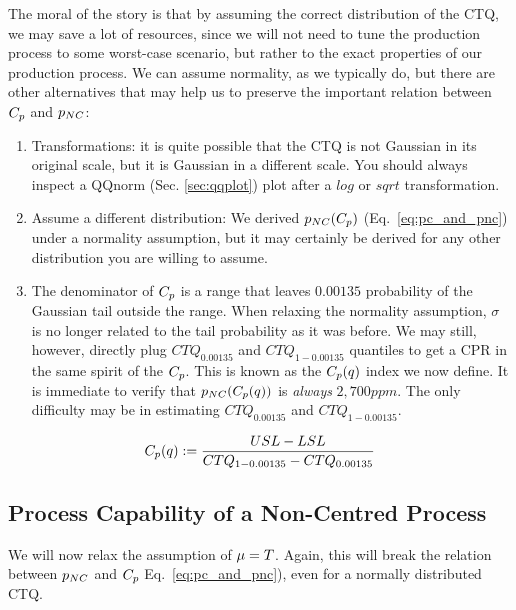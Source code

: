 The moral of the story is that by assuming the correct distribution of the CTQ, we may save a lot of resources, since we will not need to tune the production process to some worst-case scenario, but rather to the exact properties of our production process. 
We can assume normality, as we typically do, but there are other alternatives that may help us to preserve the important relation between $C_p$ and $p_{NC}$:
\begin{enumerate}
\item Transformations: it is quite possible that the CTQ is not Gaussian in its original scale, but it is Gaussian in a different scale. You should always inspect a QQnorm (Sec. \ref{sec:qqplot}) plot after a $log$ or $sqrt$ transformation.
\item Assume a different distribution: We derived $p_{NC}(C_p)$ (Eq.~\ref{eq:pc_and_pnc}) under a normality assumption, but it may certainly be derived for any other distribution you are willing to assume. 
\item The denominator of $C_p$ is a range that leaves $0.00135$ probability of the Gaussian tail outside the range. 
When relaxing the normality assumption, $\sigma$ is no longer related to the tail probability as it was before. We may still, however, directly plug $CTQ_{0.00135}$ and $CTQ_{1-0.00135}$ quantiles to get a CPR in the same spirit of the $C_p$. This is known as the $\cpq$ index we now define. It is immediate to verify that $p_{NC}(C_p(q))$ is \emph{always} $2,700ppm$.
The only difficulty may be in estimating $CTQ_{0.00135}$ and $CTQ_{1-0.00135}$. 

\end{enumerate}

\begin{definition}[$\cpq$]
\begin{align}
	C_p(q):= \frac{USL-LSL}{CTQ_{1-0.00135}-CTQ_{0.00135}}
\end{align}
\end{definition}






\subsection{Process Capability of a Non-Centred Process}
We will now relax the assumption of $\mu=T$.
Again, this will break the relation between $p_{NC}$ and $C_p$ Eq.~\ref{eq:pc_and_pnc}), even for a normally distributed CTQ.

